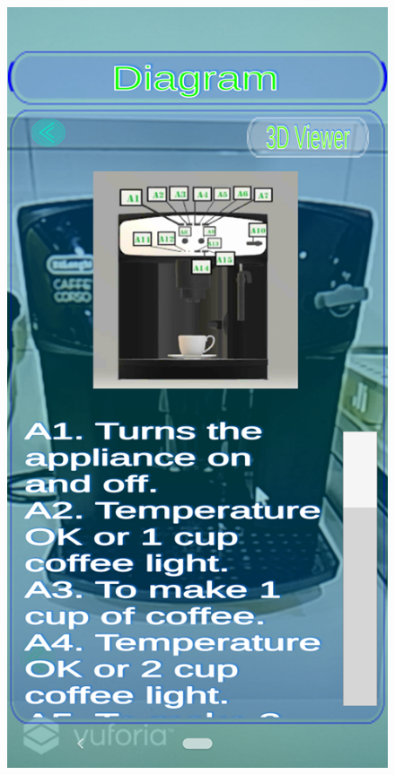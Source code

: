 \documentclass{aifyp}
\begin{document}
\begin{appendices}
\begin{figure}[H]
\begin{minipage}{.5\textwidth}
          \label{fig:CappuccinoDetails}
        \end{minipage}
\end{figure}
\begin{figure}[H]
    \centering
        \begin{minipage}{.5\textwidth}
          \centering
          \includegraphics[scale=0.45]{Images/Chapter5/Impl5.png}

\end{minipage}
\end{figure}
\end{appendices}
\end{document}
